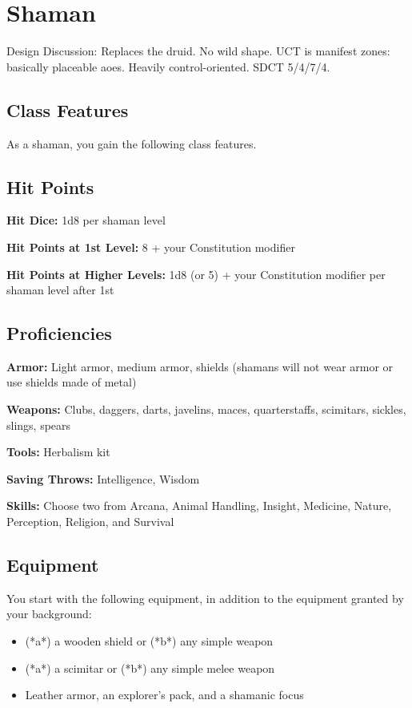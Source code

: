 \section{Shaman}

Design Discussion: Replaces the druid. No wild shape. UCT is manifest zones: basically placeable aoes. Heavily control-oriented. SDCT 5/4/7/4.

\subsection{Class Features}

As a shaman, you gain the following class features.

\subsection{Hit Points}

\textbf{Hit Dice:} 1d8 per shaman level

\textbf{Hit Points at 1st Level:} 8 + your Constitution modifier

\textbf{Hit Points at Higher Levels:} 1d8 (or 5) + your Constitution modifier per shaman level after 1st

\subsection{Proficiencies}

\textbf{Armor:} Light armor, medium armor, shields (shamans will not wear armor or use shields made of metal)

\textbf{Weapons:} Clubs, daggers, darts, javelins, maces, quarterstaffs, scimitars, sickles, slings, spears

\textbf{Tools:} Herbalism kit

\textbf{Saving Throws:} Intelligence, Wisdom

\textbf{Skills:} Choose two from Arcana, Animal Handling, Insight, Medicine, Nature, Perception, Religion, and Survival

\subsection{Equipment}

You start with the following equipment, in addition to the equipment granted by your background:
\begin{itemize}
\item (*a*) a wooden shield or (*b*) any simple weapon
\item (*a*) a scimitar or (*b*) any simple melee weapon
\item Leather armor, an explorer's pack, and a shamanic focus
\end{itemize}

